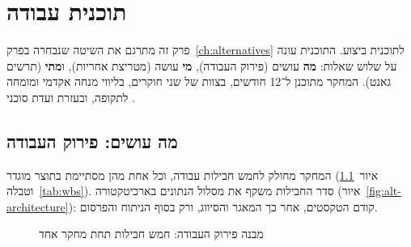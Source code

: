 
\chapter{תוכנית עבודה}
\label{ch:workplan}

פרק זה מתרגם את השיטה שנבחרה בפרק~\ref{ch:alternatives} לתוכנית ביצוע. התוכנית עונה על שלוש שאלות: \textbf{מה} עושים (פירוק העבודה), \textbf{מי} עושה (מטריצת אחריות), ו\textbf{מתי} (תרשים גאנט). המחקר מתוכנן ל־12 חודשים, בצוות של שני חוקרים, בליווי מנחה אקדמי ומומחה לתקופה, ובעזרת ועדת סוכני .

\section{מה עושים: פירוק העבודה}
\label{sec:wp-wbs}

המחקר מחולק לחמש חבילות עבודה, וכל אחת מהן מסתיימת בתוצר מוגדר (איור~\ref{fig:wbs} וטבלה~\ref{tab:wbs}). סדר החבילות משקף את מסלול הנתונים בארכיטקטורה (איור~\ref{fig:alt-architecture}): קודם הטקסטים, אחר כך המאגר והסיווג, ורק בסוף הניתוח והפרסום.

\begin{figure}[htbp]
  \centering
  
  \caption{מבנה פירוק העבודה: חמש חבילות תחת מחקר אחד}
  \label{fig:wbs}
\end{figure}

